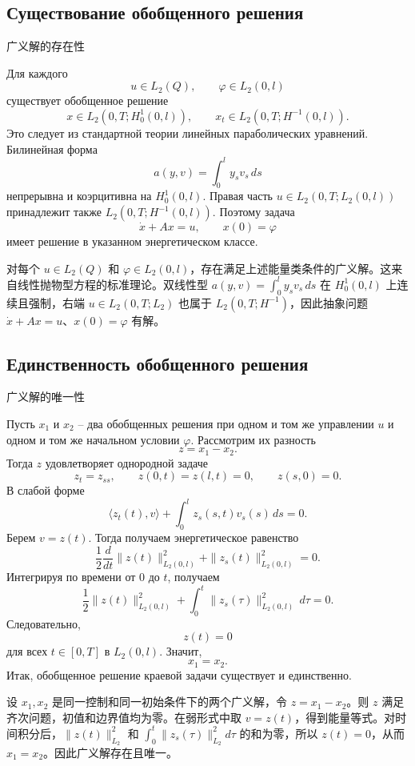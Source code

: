 \documentclass[12pt,a4paper]{article}
\newcommand{\zh}[1]{\par\noindent #1\par}
\begin{document}
\subsection*{Существование обобщенного решения}
\zh{广义解的存在性}
Для каждого
\[
u\in L_2(Q),
\qquad
\varphi\in L_2(0,l)
\]
существует обобщенное решение
\[
x\in L_2(0,T;H_0^1(0,l)),
\qquad
x_t\in L_2(0,T;H^{-1}(0,l)).
\]
Это следует из стандартной теории линейных параболических уравнений. Билинейная форма
\[
a(y,v)=\int_0^l y_s v_s\,ds
\]
непрерывна и коэрцитивна на \(H_0^1(0,l)\). Правая часть \(u\in L_2(0,T;L_2(0,l))\) принадлежит также \(L_2(0,T;H^{-1}(0,l))\). Поэтому задача
\[
\dot x+Ax=u,
\qquad x(0)=\varphi
\]
имеет решение в указанном энергетическом классе.
\zh{对每个 \(u\in L_2(Q)\) 和 \(\varphi\in L_2(0,l)\)，存在满足上述能量类条件的广义解。这来自线性抛物型方程的标准理论。双线性型 \(a(y,v)=\int_0^l y_s v_s\,ds\) 在 \(H_0^1(0,l)\) 上连续且强制，右端 \(u\in L_2(0,T;L_2)\) 也属于 \(L_2(0,T;H^{-1})\)，因此抽象问题 \(\dot x+Ax=u\)、\(x(0)=\varphi\) 有解。}

\subsection*{Единственность обобщенного решения}
\zh{广义解的唯一性}
Пусть \(x_1\) и \(x_2\) -- два обобщенных решения при одном и том же управлении \(u\) и одном и том же начальном условии \(\varphi\). Рассмотрим их разность
\[
z=x_1-x_2.
\]
Тогда \(z\) удовлетворяет однородной задаче
\[
z_t=z_{ss},
\qquad z(0,t)=z(l,t)=0,
\qquad z(s,0)=0.
\]
В слабой форме
\[
\langle z_t(t),v\rangle+
\int_0^l z_s(s,t)v_s(s)\,ds=0.
\]
Берем \(v=z(t)\). Тогда получаем энергетическое равенство
\[
\frac12\frac{d}{dt}\|z(t)\|_{L_2(0,l)}^2+
\|z_s(t)\|_{L_2(0,l)}^2=0.
\]
Интегрируя по времени от \(0\) до \(t\), получаем
\[
\frac12\|z(t)\|_{L_2(0,l)}^2+
\int_0^t\|z_s(\tau)\|_{L_2(0,l)}^2\,d\tau=0.
\]
Следовательно,
\[
z(t)=0
\]
для всех \(t\in[0,T]\) в \(L_2(0,l)\). Значит,
\[
x_1=x_2.
\]
Итак, обобщенное решение краевой задачи существует и единственно.
\zh{设 \(x_1,x_2\) 是同一控制和同一初始条件下的两个广义解，令 \(z=x_1-x_2\)。则 \(z\) 满足齐次问题，初值和边界值均为零。在弱形式中取 \(v=z(t)\)，得到能量等式。对时间积分后，\(\|z(t)\|_{L_2}^2\) 和 \(\int_0^t\|z_s(\tau)\|_{L_2}^2d\tau\) 的和为零，所以 \(z(t)=0\)，从而 \(x_1=x_2\)。因此广义解存在且唯一。}
\end{document}
